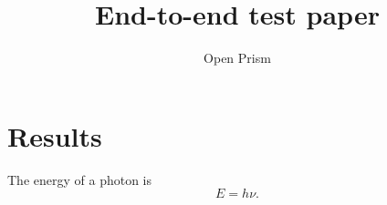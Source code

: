 \documentclass{article}
\title{End-to-end test paper}
\author{Open Prism}
\date{}
\begin{document}
\maketitle



\section{Results}
The energy of a photon is
\begin{equation}
  E = h\nu .
\end{equation}
\end{document}
